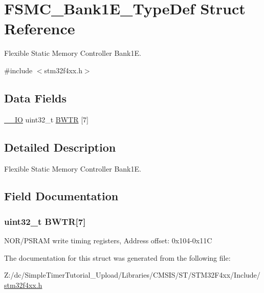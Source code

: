 \hypertarget{struct_f_s_m_c___bank1_e___type_def}{\section{F\-S\-M\-C\-\_\-\-Bank1\-E\-\_\-\-Type\-Def Struct Reference}
\label{struct_f_s_m_c___bank1_e___type_def}
}


Flexible Static Memory Controller Bank1\-E.  




{\ttfamily \#include $<$stm32f4xx.\-h$>$}

\subsection*{Data Fields}
\begin{DoxyCompactItemize}
\item 
\hyperlink{group___c_m_s_i_s__core__definitions_gaec43007d9998a0a0e01faede4133d6be}{\-\_\-\-\_\-\-I\-O} uint32\-\_\-t \hyperlink{struct_f_s_m_c___bank1_e___type_def_a20f13b79c0f8670af319af0c5ebd5c91}{B\-W\-T\-R} \mbox{[}7\mbox{]}
\end{DoxyCompactItemize}


\subsection{Detailed Description}
Flexible Static Memory Controller Bank1\-E. 

\subsection{Field Documentation}
\hypertarget{struct_f_s_m_c___bank1_e___type_def_a20f13b79c0f8670af319af0c5ebd5c91}{
\subsubsection[{B\-W\-T\-R}]{ uint32\-\_\-t B\-W\-T\-R\mbox{[}7\mbox{]}}}\label{struct_f_s_m_c___bank1_e___type_def_a20f13b79c0f8670af319af0c5ebd5c91}
N\-O\-R/\-P\-S\-R\-A\-M write timing registers, Address offset\-: 0x104-\/0x11\-C 

The documentation for this struct was generated from the following file\-:\begin{DoxyCompactItemize}
\item 
Z\-:/dc/\-Simple\-Timer\-Tutorial\-\_\-\-Upload/\-Libraries/\-C\-M\-S\-I\-S/\-S\-T/\-S\-T\-M32\-F4xx/\-Include/\hyperlink{stm32f4xx_8h}{stm32f4xx.\-h}\end{DoxyCompactItemize}

